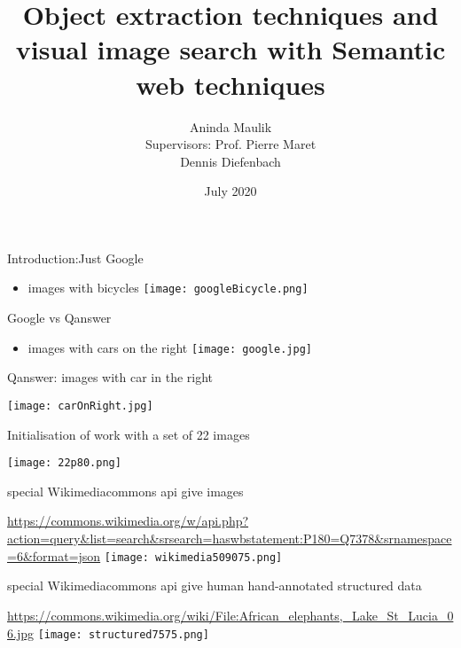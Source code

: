 \documentclass{beamer}
\title{Object extraction techniques and visual image search with Semantic web techniques}
\author[Aninda Maulik]{Aninda Maulik\\[10mm]{\small Supervisors: Prof. Pierre Maret \\ \hspace{18mm} Dennis Diefenbach}}
\institute[University Jean Monnet] %
{
  
  Cyber Physical and Social Systems\\
  University of Jean Monnet

}
\date{July 2020}
\begin{document}
\maketitle

\begin{frame}{Introduction:Just Google}
   \begin{itemize}
       \item images with bicycles
       \texttt{[image: googleBicycle.png]}

\end{itemize}
\end{frame}

\begin{frame}{Google vs Qanswer}
   \begin{itemize}
       \item images with cars on the right
       \texttt{[image: google.jpg]}

\end{itemize}
\end{frame}
    

\begin{frame}{Qanswer: images with car in the right}

       \texttt{[image: carOnRight.jpg]}


\end{frame}

\begin{frame}{Initialisation of work with a set of 22 images}

       \texttt{[image: 22p80.png]}


\end{frame}

\begin{frame}{special Wikimediacommons api give images }

\url{https://commons.wikimedia.org/w/api.php?action=query&list=search&srsearch=haswbstatement:P180=Q7378&srnamespace=6&format=json}
  \texttt{[image: wikimedia509075.png]}     


\end{frame}

\begin{frame}{special Wikimediacommons api give human hand-annotated structured data}

\url{https://commons.wikimedia.org/wiki/File:African_elephants,_Lake_St_Lucia_06.jpg}
  \texttt{[image: structured7575.png]}     


\end{frame}
\end{document}
